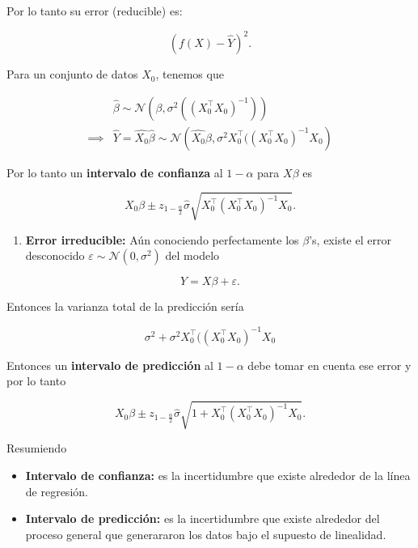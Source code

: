 \documentclass[
  12pt,
]{book}
\providecommand{\tightlist}{%
  \setlength{\itemsep}{0pt}\setlength{\parskip}{0pt}}
\theoremstyle{definition}
\theoremstyle{definition}
\theoremstyle{definition}
\theoremstyle{remark}
\begin{document}
Por lo tanto su error (reducible) es:

\begin{equation*}
\left(  f(X) - \hat{Y}\right) ^{2}. 
\end{equation*}

Para un conjunto de datos \(X_{0}\), tenemos que

\begin{align*}
 & \hat{\beta} \sim  \mathcal{N}\left(\beta, \sigma^{2}\left( (X_{0}^{\top}X_{0})^{-1} \right)\right) \\
 \implies & \hat{Y} = \hat{X_{0}}\hat{\beta} \sim \mathcal{N}\left(\hat{X_{0}}\beta , \sigma^{2}X_{0}^{\top}((X_{0}^{\top}X_{0})^{-1}X_{0}  \right)
\end{align*}

Por lo tanto un \textbf{intervalo de confianza} al \(1-\alpha\) para \(X\beta\) es

\begin{equation*}
X_{0}\beta \pm z_{1-\frac{\alpha}{2}} \hat{\sigma} \sqrt{X_{0}^{\top}(X_{0}^{\top}X_{0})^{-1}X_{0}}.
\end{equation*}

\begin{enumerate}
\def\labelenumi{\arabic{enumi}.}
\setcounter{enumi}{1}
\tightlist
\item
  \textbf{Error irreducible:} Aún conociendo perfectamente los \(\beta\)'s, existe el error desconocido \(\varepsilon\sim \mathcal{N}\left(0,\sigma^{2}\right)\) del modelo
\end{enumerate}

\begin{equation*}
Y = X\beta + \varepsilon.
\end{equation*}

Entonces la varianza total de la predicción sería

\begin{equation*}
\sigma^{2} +  \sigma^{2}X_{0}^{\top}( (X_{0}^{\top}X_{0})^{-1}X_{0} 
\end{equation*}

Entonces un \textbf{intervalo de predicción} al \(1-\alpha\) debe tomar en cuenta ese error y por lo tanto

\begin{equation*}
X_{0}\beta \pm z_{1-\frac{\alpha}{2}} \hat{\sigma} \sqrt{1+X_{0}^{\top}(X_{0}^{\top}X_{0})^{-1}X_{0}}.
\end{equation*}

Resumiendo

\begin{itemize}
\tightlist
\item
  \textbf{Intervalo de confianza:} es la incertidumbre que existe alrededor de la línea de regresión.
\item
  \textbf{Intervalo de predicción:} es la incertidumbre que existe alrededor del proceso general que generararon los datos bajo el supuesto de linealidad.
\end{itemize}
\end{document}
